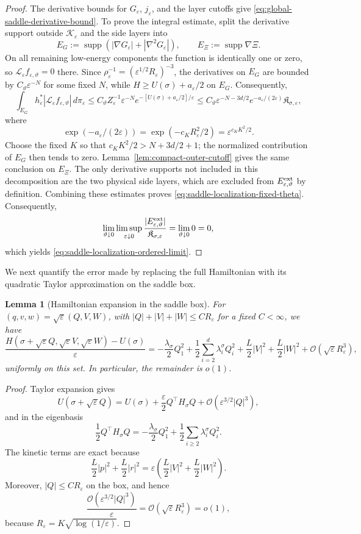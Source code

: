 \documentclass[11pt]{article}
\numberwithin{equation}{section}
\theoremstyle{plain}
\newtheorem{lemma}[theorem]{Lemma}
\theoremstyle{definition}
\theoremstyle{remark}
\newcommand{\eps}{\varepsilon}
\newcommand{\calL}{\mathcal L}
\begin{document}
\begin{proof}
The derivative bounds for $G_\eps$, $j_\eps$, and the layer cutoffs give
\eqref{eq:global-saddle-derivative-bound}.  To prove the integral estimate,
split the derivative support outside $\mathcal K_\eps$ and the side
layers into
\[
E_G:=\operatorname{supp}\left(\left|\nabla G_\eps\right|+\left|\nabla^2G_\eps\right|\right),
\qquad
E_\Xi:=\operatorname{supp}\nabla\Xi.
\]
On all remaining low-energy components the function is identically one or
zero, so $\calL_\eps f_{\eps,\vartheta}=0$ there.  Since
$\rho_\eps^{-1}=(\eps^{1/2}R_\eps)^{-3}$, the derivatives on $E_G$ are bounded
by $C_\vartheta\eps^{-N}$ for some fixed $N$, while
$H\ge U(\sigma)+a_\eps/2$ on $E_G$.  Consequently,
\[
\int_{E_G}h_\eps^*|\calL_\eps f_{\eps,\vartheta}|\,d\pi_\eps
\le C_\vartheta Z_\eps^{-1}\eps^{-N}
e^{-[U(\sigma)+a_\eps/2]/\eps}
\le C_\vartheta\eps^{-N-3d/2}
e^{-a_\eps/(2\eps)}\mathfrak K_{\sigma,\eps},
\]
where
\[
\exp\left(-a_\eps/(2\eps)\right)
=\exp\left(-c_KR_\eps^2/2\right)=\eps^{c_KK^2/2}.
\]
Choose the fixed $K$ so that $c_KK^2/2>N+3d/2+1$; the normalized contribution
of $E_G$ then tends to zero.  Lemma~\ref{lem:compact-outer-cutoff} gives the
same conclusion on $E_\Xi$.  The only derivative supports not included in
this decomposition are the two physical side layers, which are excluded from
$E_{\eps,\vartheta}^{\rm ext}$ by definition.  Combining these estimates proves
\eqref{eq:saddle-localization-fixed-theta}.  Consequently,
\[
\lim_{\vartheta\downarrow0}\limsup_{\eps\downarrow0}
\frac{|E_{\eps,\vartheta}^{\rm ext}|}{\mathfrak K_{\sigma,\eps}}
=\lim_{\vartheta\downarrow0}0=0,
\]
which yields \eqref{eq:saddle-localization-ordered-limit}.
\end{proof}

We next quantify the error made by replacing the full
Hamiltonian with its quadratic Taylor approximation on the saddle box.

\begin{lemma}[Hamiltonian expansion in the saddle box]
\label{lem:saddle-hamiltonian-expansion}
For $(q,v,w)=\sqrt\eps(Q,V,W)$, with
$|Q|+|V|+|W|\le C R_\eps$ for a fixed $C<\infty$, we have
\[
\frac{H(\sigma+\sqrt\eps Q,\sqrt\eps V,\sqrt\eps W)-U(\sigma)}{\eps}
=-\frac{\lambda_\sigma}{2}Q_1^2+\frac12\sum_{i=2}^d\lambda_i^\sigma Q_i^2
+\frac L2|V|^2+\frac L2|W|^2
+\mathcal O\left(\sqrt\eps R_\eps^3\right),
\]
uniformly on this set.  In particular, the remainder is $o(1)$.
\end{lemma}

\begin{proof}
Taylor expansion gives
\[
U\left(\sigma+\sqrt\eps Q\right)=U(\sigma)+\frac\eps2 Q^\top H_\sigma Q+\mathcal O\left(\eps^{3/2}|Q|^3\right),
\]
and in the eigenbasis
\[
\frac12 Q^\top H_\sigma Q=-\frac{\lambda_\sigma}{2}Q_1^2+\frac12\sum_{i\ge2}\lambda_i^\sigma Q_i^2.
\]
The kinetic terms are exact because
\[
\frac L2|p|^2+\frac L2|r|^2
=\eps\left(\frac L2|V|^2+\frac L2|W|^2\right).
\]
Moreover, $|Q|\le C R_\eps$ on the box, and hence
\[
\frac{\mathcal O(\eps^{3/2}|Q|^3)}{\eps}
=\mathcal O\left(\sqrt\eps R_\eps^3\right)=o(1),
\]
because $R_\eps=K\sqrt{\log(1/\eps)}$.
\end{proof}
\end{document}
